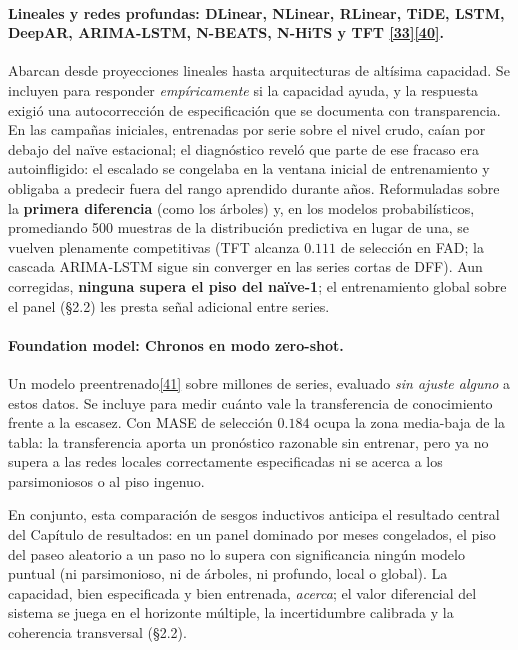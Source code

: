 \documentclass[12pt,letterpaper]{report}
\newcommand{\cita}[1]{\hyperref[bib:#1]{[#1]}}
\begin{document}
\paragraph{Lineales y redes profundas: DLinear, NLinear, RLinear, TiDE, LSTM, DeepAR, ARIMA-LSTM,
N-BEATS, N-HiTS y TFT \cita{33}\textendash\cita{40}.} Abarcan desde proyecciones lineales hasta
arquitecturas de altísima capacidad. Se incluyen para responder \textit{empíricamente} si la
capacidad ayuda, y la respuesta exigió una autocorrección de especificación que se documenta
con transparencia. En las campañas iniciales, entrenadas por serie sobre el nivel crudo,
caían por debajo del naïve estacional; el diagnóstico reveló que parte de ese fracaso era
autoinfligido: el escalado se congelaba en la ventana inicial de entrenamiento y obligaba a
predecir fuera del rango aprendido durante años. Reformuladas sobre la \textbf{primera
diferencia} (como los árboles) y, en los modelos probabilísticos, promediando 500 muestras
de la distribución predictiva en lugar de una, se vuelven plenamente competitivas (TFT
alcanza $0.111$ de selección en FAD; la cascada ARIMA-LSTM sigue sin converger en las series
cortas de DFF). Aun corregidas, \textbf{ninguna supera el piso del naïve-1}; el
entrenamiento global sobre el panel (§2.2) les presta señal adicional entre series.

\paragraph{Foundation model: Chronos en modo zero-shot.} Un modelo preentrenado\cita{41} sobre
millones de series, evaluado \textit{sin ajuste alguno} a estos datos. Se incluye para medir
cuánto vale la transferencia de conocimiento frente a la escasez. Con MASE de selección
$0.184$ ocupa la zona media-baja de la tabla: la transferencia aporta un pronóstico
razonable sin entrenar, pero ya no supera a las redes locales correctamente especificadas ni
se acerca a los parsimoniosos o al piso ingenuo.

En conjunto, esta comparación de sesgos inductivos anticipa el resultado central del Capítulo de
resultados: en un panel dominado por meses congelados, el piso del paseo aleatorio a un paso
no lo supera con significancia ningún modelo puntual (ni parsimonioso, ni de árboles, ni
profundo, local o global). La capacidad, bien especificada y bien entrenada, \textit{acerca};
el valor diferencial del sistema se juega en el horizonte múltiple, la incertidumbre
calibrada y la coherencia transversal (§2.2).
\end{document}
